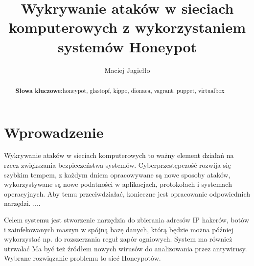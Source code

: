 \documentclass[runningheads,a4paper]{llncs}
\newcommand{\keywords}[1]{\par\addvspace\baselineskip
\noindent\keywordname\enspace\ignorespaces#1}
\renewcommand{\keywordname}{\textbf{Słowa kluczowe:}}
\begin{document}
\mainmatter  %

\title{Wykrywanie ataków w sieciach komputerowych z wykorzystaniem systemów Honeypot}


\author{Maciej Jagiełło}


\institute{}

%
%



\begin{abstract}

\keywords{honeypot, glastopf, kippo, dionaea, vagrant, puppet, virtualbox}
\end{abstract}


\section{Wprowadzenie}

Wykrywanie ataków w sieciach komputerowych to ważny element działań na rzecz zwiększania bezpieczeństwa systemów. Cyberprzestępczość rozwija się szybkim tempem, z każdym dniem opracowywane są nowe sposoby ataków, wykorzystywane są nowe podatności w aplikacjach, protokołach i systemach operacyjnych. Aby temu przeciwdziałać, konieczne jest opracowanie odpowiednich narzędzi. ....

Celem systemu jest stworzenie narzędzia do zbierania adresów IP hakerów, botów i zainfekowanych maszyn w spójną bazę danych, którą będzie można później wykorzystać np. do rozszerzania reguł zapór ogniowych. System ma również utrwalać Ma być też źródłem nowych wirusów do analizowania przez antywirusy. Wybrane rozwiązanie problemu to sieć Honeypotów.
\end{document}
